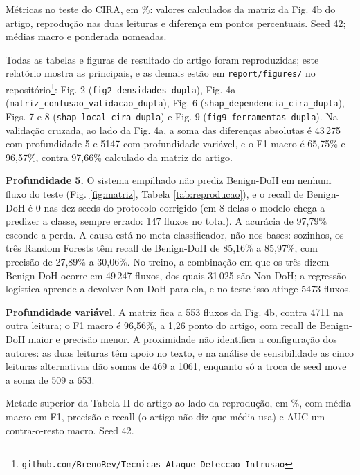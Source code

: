 \documentclass[conference]{IEEEtran}
\newcommand{\tabelacoluna}[1]{{\footnotesize\setlength{\tabcolsep}{3pt}%
  \begin{adjustbox}{max width=\columnwidth}\end{adjustbox}}}
\newcommand{\us}{\_\allowbreak}
\newcommand{\tabelapagina}[1]{{\footnotesize\setlength{\tabcolsep}{3pt}%
  \begin{adjustbox}{max width=\textwidth}\end{adjustbox}}}
\begin{document}
\begin{table}[!t]
\centering
\caption{Métricas no teste do CIRA, em \%: valores calculados da matriz da Fig. 4b do artigo, reprodução nas duas leituras e diferença em pontos percentuais. Seed 42; médias macro e ponderada nomeadas.}
\label{tab:reproducao}
\tabelacoluna{reproducao_metricas}
\end{table}

Todas as tabelas e figuras de resultado do artigo foram reproduzidas; este relatório mostra as principais, e as demais estão em \texttt{report/figures/} no repositório\footnote{\texttt{github.com/BrenoRev/Tecnicas\_Ataque\_Deteccao\_Intrusao}}: Fig. 2 (\texttt{fig2\us densidades\us dupla}), Fig. 4a (\texttt{matriz\us confusao\us validacao\us dupla}), Fig. 6 (\texttt{shap\us dependencia\us cira\us dupla}), Figs. 7 e 8 (\texttt{shap\us local\us cira\us dupla}) e Fig. 9 (\texttt{fig9\us ferramentas\us dupla}). Na validação cruzada, ao lado da Fig. 4a, a soma das diferenças absolutas é 43\,275 com profundidade 5 e 5147 com profundidade variável, e o F1 macro é 65,75\% e 96,57\%, contra 97,66\% calculado da matriz do artigo.

\textbf{Profundidade 5.} O sistema empilhado não prediz Benign-DoH em nenhum fluxo do teste (Fig. \ref{fig:matriz}, Tabela \ref{tab:reproducao}), e o recall de Benign-DoH é 0 nas dez seeds do protocolo corrigido (em 8 delas o modelo chega a predizer a classe, sempre errado: 147 fluxos no total). A acurácia de 97,79\% esconde a perda. A causa está no meta-classificador, não nos bases: sozinhos, os três Random Forests têm recall de Benign-DoH de 85,16\% a 85,97\%, com precisão de 27,89\% a 30,06\%. No treino, a combinação em que os três dizem Benign-DoH ocorre em 49\,247 fluxos, dos quais 31\,025 são Non-DoH; a regressão logística aprende a devolver Non-DoH para ela, e no teste isso atinge 5473 fluxos.

\textbf{Profundidade variável.} A matriz fica a 553 fluxos da Fig. 4b, contra 4711 na outra leitura; o F1 macro é 96,56\%, a 1,26 ponto do artigo, com recall de Benign-DoH maior e precisão menor. A proximidade não identifica a configuração dos autores: as duas leituras têm apoio no texto, e na análise de sensibilidade as cinco leituras alternativas dão somas de 469 a 1061, enquanto só a troca de seed move a soma de 509 a 653.

\begin{table}[!t]
\centering
\caption{Metade superior da Tabela II do artigo ao lado da reprodução, em \%, com média macro em F1, precisão e recall (o artigo não diz que média usa) e AUC um-contra-o-resto macro. Seed 42.}
\label{tab:tabela2}
\tabelapagina{tabela2_superior_macro_dupla}
\end{table}
\end{document}
